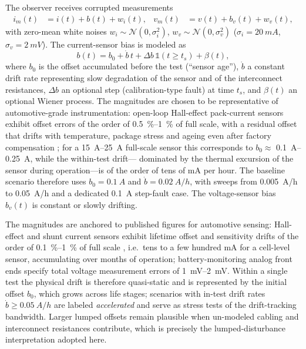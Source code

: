 \documentclass[11pt,a4paper]{article}
\begin{document}
The observer receives corrupted measurements
\begin{align}
  i_m(t) &= i(t) + b(t) + w_i(t), &
  v_m(t) &= v(t) + b_v(t) + w_v(t),
\end{align}
with zero-mean white noises $w_i \sim \mathcal{N}(0,\sigma_i^2)$,
$w_v \sim \mathcal{N}(0,\sigma_v^2)$
($\sigma_i = \SI{20}{mA}$, $\sigma_v = \SI{2}{mV}$). The current-sensor
bias is modeled as
\begin{equation}
  b(t) = b_0 + \dot{b}\,t + \Delta b\,\mathbb{1}(t \ge t_s) + \beta(t),
  \label{eq:bias-model}
\end{equation}
where $b_0$ is the offset accumulated before the test (``sensor age''),
$\dot{b}$ a constant drift rate representing slow degradation of the
sensor and of the interconnect resistances, $\Delta b$ an optional step
(calibration-type fault) at time $t_s$, and $\beta(t)$ an optional Wiener
process. The magnitudes are chosen to be representative of automotive-grade
instrumentation: open-loop Hall-effect pack-current sensors exhibit offset
errors of the order of \SIrange{0.5}{1}{\percent} of full scale, with a
residual offset that drifts with temperature, package stress and ageing
even after factory compensation \citep{allegro_hall}; for a
\SIrange{15}{25}{A} full-scale sensor this corresponds to
$b_0 \approx$ \SIrange{0.1}{0.25}{A}, while the within-test drift---
dominated by the thermal excursion of the sensor during operation---is of
the order of tens of \si{mA} per hour. The baseline scenario therefore
uses $b_0 = \SI{0.1}{A}$ and $\dot b = \SI{0.02}{A/h}$, with sweeps from
\SI{0.005}{A/h} to \SI{0.05}{A/h} and a dedicated \SI{0.1}{A}
step-fault case. The voltage-sensor bias $b_v(t)$ is constant or slowly drifting.

The magnitudes are anchored to published figures for automotive sensing:
Hall-effect and shunt current sensors exhibit lifetime offset and
sensitivity drifts of the order of \SIrange{0.1}{1}{\percent} of full
scale \citep{melexis2023shunt}, i.e.\ tens to a few hundred
\si{\milli\ampere} for a cell-level sensor, accumulating over months of
operation; battery-monitoring analog front ends specify total voltage
measurement errors of \SIrange{1}{2}{\milli\volt}. Within a single test
the physical drift is therefore quasi-static and is represented by the
initial offset $b_0$, which grows across life stages; scenarios with
in-test drift rates $\dot b \ge \SI{0.05}{A/h}$ are labeled
\emph{accelerated} and serve as stress tests of the drift-tracking
bandwidth. Larger lumped offsets remain plausible when un-modeled cabling
and interconnect resistances contribute, which is precisely the
lumped-disturbance interpretation adopted here.
\end{document}
